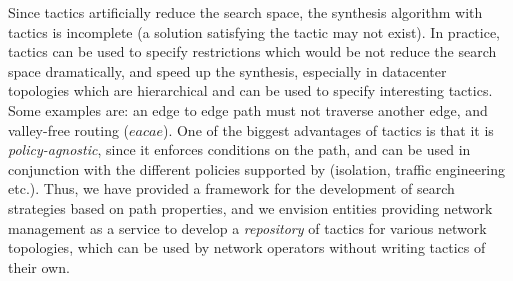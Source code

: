  Since tactics artificially reduce the search space, the synthesis algorithm with tactics is incomplete (a solution satisfying the tactic may not exist). 
 In practice, tactics can be used to specify restrictions which would be not reduce the search space dramatically, 
 and speed up the synthesis, especially in datacenter topologies which are hierarchical 
 and can be used to specify interesting tactics. Some examples are: an edge to edge path must not
 traverse another edge, and valley-free routing ($eacae$). One of the biggest advantages
 of tactics is that it is \emph{policy-agnostic}, since it enforces conditions on the path, and
 can be used in conjunction with the different policies supported by \name (isolation, traffic engineering etc.).  
 Thus, we have provided a framework for the
 development of search strategies based on path properties, and we envision entities providing network
 management as a service to develop a \emph{repository} of tactics for various network topologies, 
 which can be used by network operators without writing tactics of their own. 


